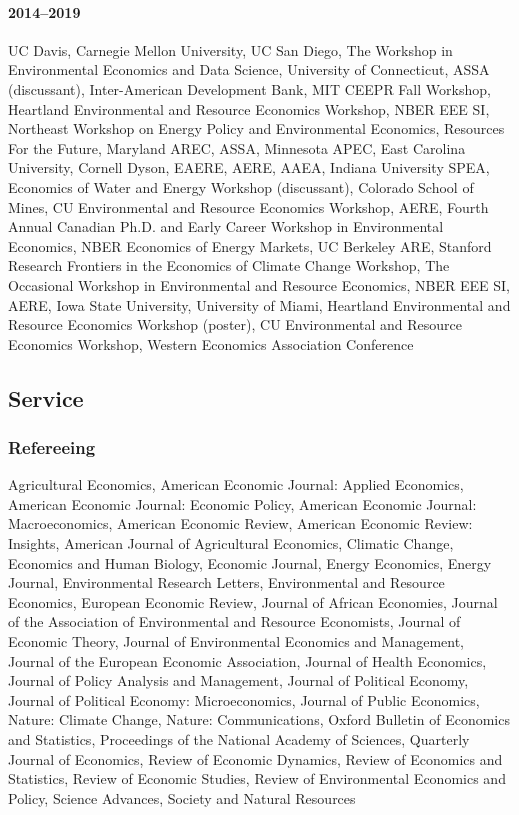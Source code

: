 \documentclass[11pt]{res} %
\begin{document}
\begin{resume}
\paragraph{2014--2019} UC Davis, Carnegie Mellon University, UC San Diego, The Workshop in Environmental Economics and Data Science, University of Connecticut, ASSA (discussant), Inter-American Development Bank, MIT CEEPR Fall Workshop, Heartland Environmental and Resource Economics Workshop, NBER EEE SI, Northeast Workshop on Energy Policy and Environmental Economics, Resources For the Future, Maryland AREC, ASSA, Minnesota APEC, East Carolina University, Cornell Dyson, EAERE, AERE, AAEA, Indiana University SPEA, Economics of Water and Energy Workshop (discussant), Colorado School of Mines, CU Environmental and Resource Economics Workshop, AERE, Fourth Annual Canadian Ph.D. and Early Career Workshop in Environmental Economics, NBER Economics of Energy Markets, UC Berkeley ARE, Stanford Research Frontiers in the Economics of Climate Change Workshop, The Occasional Workshop in Environmental and Resource Economics, NBER EEE SI, AERE, Iowa State University, University of Miami, Heartland Environmental and Resource Economics Workshop (poster), CU Environmental and Resource Economics Workshop, Western Economics Association Conference

\vspace{-.2in}

\subsection{Service}\vspace{-.2in}
\subsubsection{Refereeing}\vspace{-.2in}
	Agricultural Economics,
	American Economic Journal: Applied Economics,
	American Economic Journal: Economic Policy,
	American Economic Journal: Macroeconomics,
	American Economic Review,
	American Economic Review: Insights,
	American Journal of Agricultural Economics,
	Climatic Change,
	Economics and Human Biology,
	Economic Journal,
	Energy Economics,
	Energy Journal,
	Environmental Research Letters,
	Environmental and Resource Economics,
	European Economic Review,
	Journal of African Economies,
	Journal of the Association of Environmental and Resource Economists,
	Journal of Economic Theory,
	Journal of Environmental Economics and Management,
	Journal of the European Economic Association,
	Journal of Health Economics,
	Journal of Policy Analysis and Management,
	Journal of Political Economy,
	Journal of Political Economy: Microeconomics,
	Journal of Public Economics,
	Nature: Climate Change,
	Nature: Communications,
	Oxford Bulletin of Economics and Statistics,
	Proceedings of the National Academy of Sciences,
	Quarterly Journal of Economics,
	Review of Economic Dynamics,
	Review of Economics and Statistics,
	Review of Economic Studies,
	Review of Environmental Economics and Policy,
	Science Advances,
	Society and Natural Resources


\end{resume}
\end{document}
